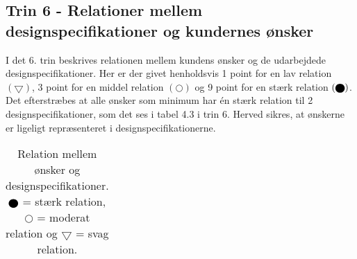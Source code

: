 \subsection{Trin 6 - Relationer mellem designspecifikationer og kundernes ønsker} \label{Trin 6}
I det 6. trin beskrives relationen mellem kundens ønsker og de udarbejdede designspecifikationer. Her er der givet henholdsvis 1 point for en lav relation $(\bigtriangledown)$, 3 point for en middel relation $(\bigcirc)$ og 9 point for en stærk relation $(\blackbigcirc)$.  Det efterstræbes at alle ønsker som minimum har én stærk relation til 2 designspecifikationer, som det ses i tabel 4.3 i trin 6. Herved sikres, at ønskerne er ligeligt repræsenteret i designspecifikationerne.

\begin{table}[H]
\centering
\caption{ Relation mellem ønsker og designspecifikationer. $\protect\blackbigcirc$ = stærk relation, $\bigcirc$ = moderat relation og $\bigtriangledown$ = svag relation.}
\label{fig: HOQ trin 6} 
\footnotesize
\def\arraystretch{2}
\begin{tabular}{|p{}|c|c|c|c|c|c|c|c|c|c|c|c|}
    \hline

\end{tabular}
\end{table}
